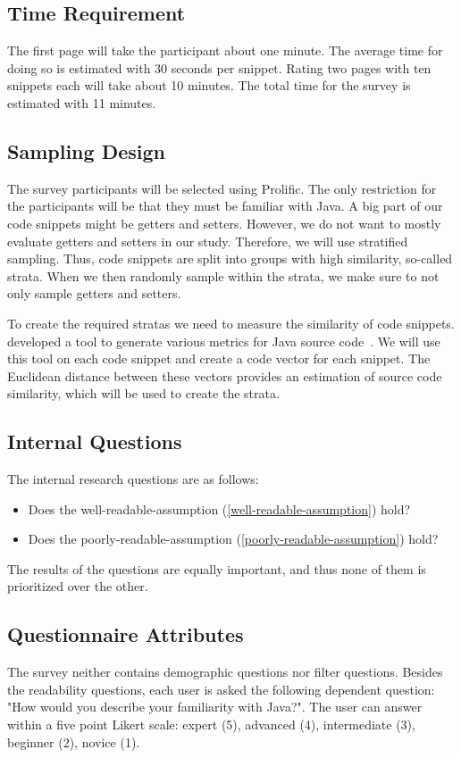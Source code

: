 \documentclass[%
class=scrreprt,
chapterprefix=false,%
open=right,%
twoside=false,%
paper=a4,%
logofile={Logo\_zentral\_farbig\_EN.png},%
thesistype=masterproposal,%
UKenglish,%
]{se2thesis}
\begin{document}
\subsection{Time Requirement}
The first page will take the participant about one minute. The average time for doing so is estimated with 30 seconds per snippet. Rating two pages with ten snippets each will take about 10 minutes. The total time for the survey is estimated with 11 minutes.

\subsection{Sampling Design}
The survey participants will be selected using Prolific. The only restriction for the participants will be that they must be familiar with Java.
A big part of our code snippets might be getters and setters. However, we do not want to mostly evaluate getters and setters in our study. Therefore, we will use stratified sampling. Thus, code snippets are split into groups with high similarity, so-called strata. When we then randomly sample within the strata, we make sure to not only sample getters and setters.

To create the required stratas we need to measure the similarity of code snippets. \citeauthor{scalabrino2016improving} developed a tool to generate various metrics for Java source code~\cite{scalabrino2016improving}. We will use this tool on each code snippet and create a code vector for each snippet. The Euclidean distance between these vectors provides an estimation of source code similarity, which will be used to create the strata.

\subsection{Internal Questions} %
The internal research questions are as follows:
\begin{itemize}
	\item Does the well-readable-assumption (\ref{well-readable-assumption}) hold?
	\item Does the poorly-readable-assumption (\ref{poorly-readable-assumption}) hold?
\end{itemize}
The results of the questions are equally important, and thus none of them is prioritized over the other.

\subsection{Questionnaire Attributes} \label{questionnaire-attributes}
The survey neither contains demographic questions nor filter questions. Besides the readability questions, each user is asked the following dependent question: "How would you describe your familiarity with Java?". The user can answer within a five point Likert scale: expert (5), advanced (4), intermediate (3), beginner (2), novice (1).
\end{document}
